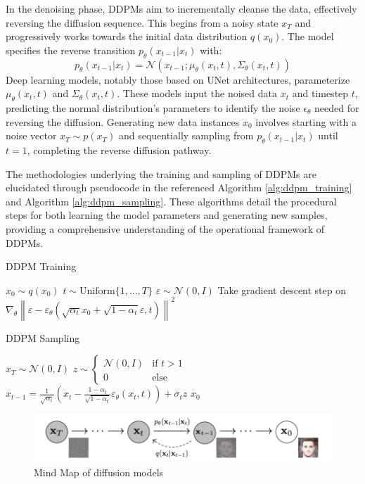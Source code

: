 In the denoising phase, DDPMs aim to incrementally cleanse the data, effectively reversing the diffusion sequence. This begins from a noisy state \(x_T\) and progressively works towards the initial data distribution \(q(x_0)\). The model specifies the reverse transition \(p_{\theta}(x_{t-1}|x_t)\) with:
\begin{equation}
p_{\theta}(x_{t-1}|x_t) = \mathcal{N}(x_{t-1}; \mu_{\theta}(x_t, t), \Sigma_{\theta}(x_t, t))
\end{equation}
Deep learning models, notably those based on UNet architectures, parameterize \( \mu_{\theta}(x_t, t) \) and \( \Sigma_{\theta}(x_t, t) \). These models input the noised data \(x_t\) and timestep \(t\), predicting the normal distribution's parameters to identify the noise \( \epsilon_{\theta} \) needed for reversing the diffusion. Generating new data instances \(x_0\) involves starting with a noise vector \(x_T \sim p(x_T)\) and sequentially sampling from \(p_{\theta}(x_{t-1}|x_t)\) until \(t=1\), completing the reverse diffusion pathway.

The methodologies underlying the training and sampling of DDPMs are elucidated through pseudocode in the referenced Algorithm \ref{alg:ddpm_training} and Algorithm \ref{alg:ddpm_sampling}. These algorithms detail the procedural steps for both learning the model parameters and generating new samples, providing a comprehensive understanding of the operational framework of DDPMs.


\begin{algorithm}
    \caption{DDPM Training}\label{alg:ddpm_training}
    \begin{algorithmic}[1]
    \Repeat
        \State $x_0 \sim q(x_0)$
        \State $t \sim \text{Uniform}\{1, \ldots, T\}$
        \State $\varepsilon \sim \mathcal{N}(0, I)$
        \State Take gradient descent step on
        \State $\nabla_\theta \left\| \varepsilon - \varepsilon_\theta(\sqrt{\alpha_t}x_0 + \sqrt{1 - \alpha_t} \varepsilon, t) \right\|^2$
    \end{algorithmic}
    \end{algorithm}
    
\begin{algorithm}
    \caption{DDPM Sampling}\label{alg:ddpm_sampling}
    \begin{algorithmic}[1]
    \State $x_T \sim \mathcal{N}(0, I)$
        \State $z \sim \begin{cases} 
        \mathcal{N}(0, I) & \text{if } t > 1 \\
        0 & \text{else}
        \end{cases}$
        \State $x_{t-1} = \frac{1}{\sqrt{\alpha_t}} \left(x_t - \frac{1-\alpha_t}{\sqrt{1 - \alpha_t}} \varepsilon_\theta(x_t, t)\right) + \sigma_t z$
    \EndFor
    \State \Return $x_0$
    \end{algorithmic}
    \end{algorithm}

\begin{figure}[h!]
    \centering
    \includegraphics[width=\textwidth]{images/DDPM.png}
    \caption{Mind Map of diffusion models \cite*{DDPM}}
\end{figure}